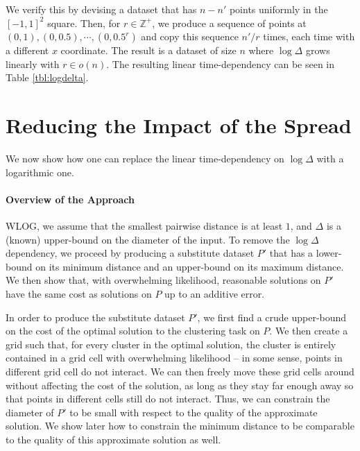 We verify this by devising a dataset that has $n - n'$ points uniformly in the $[-1, 1]^2$ square. Then, for $r \in \mathbb{Z}^+$, we produce a sequence of
points at $(0, 1), (0, 0.5), \cdots, (0, 0.5^r)$ and copy this sequence $n' / r$ times, each time with a different $x$ coordinate. The result is a dataset of
size $n$ where $\log \Delta$ grows linearly with $r \in o(n)$. The resulting linear time-dependency can be seen in Table \ref{tbl:logdelta}.



\section{Reducing the Impact of the Spread}
\label{sec:theory} %
\newcommand{\boxsize}{\textsc{MaxDist}}
We now show how one can replace the linear time-dependency on $\log \Delta$ with a logarithmic one.

\paragraph*{Overview of the Approach}

WLOG, we assume that the smallest pairwise distance is at least $1$, and $\Delta$ is a (known) upper-bound on the diameter of the input. To remove
the $\log\Delta$ dependency, we proceed by producing a substitute dataset $P'$ that has a lower-bound on its minimum distance and an upper-bound on its maximum
distance. We then show that, with overwhelming likelihood, reasonable solutions on $P'$ have the same cost as solutions on $P$ up to an additive error.

In order to produce the substitute dataset $P'$, we first find a crude upper-bound on the cost of the optimal solution to the clustering task on $P$. We
then create a grid such that, for every cluster in the optimal solution, the cluster is entirely contained in a grid cell with overwhelming likelihood -- in some sense, points in different grid cell do not interact. We can then freely move these
grid cells around without affecting the cost of the solution, as long as they stay far enough away so that points in different cells still do not interact. 
Thus, we can constrain the diameter of $P'$ to be small with respect to the quality of the approximate solution. We show later how to constrain the minimum distance to be comparable to the quality of this approximate solution as well.


